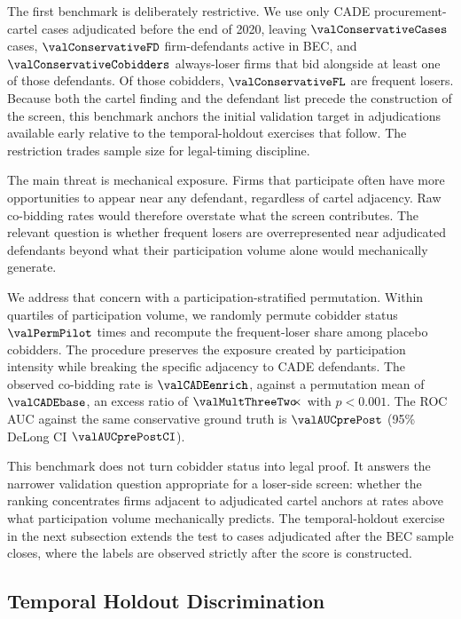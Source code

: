 The first benchmark is deliberately restrictive. We use only
CADE procurement-cartel cases adjudicated before the end of
2020, leaving $\valConservativeCases$ cases,
$\valConservativeFD$ firm-defendants active in BEC, and
$\valConservativeCobidders$ always-loser firms that bid
alongside at least one of those defendants. Of those cobidders,
$\valConservativeFL$ are frequent losers. Because both the
cartel finding and the defendant list precede the construction
of the screen, this benchmark anchors the initial validation
target in adjudications available early relative to the
temporal-holdout exercises that follow. The restriction trades
sample size for legal-timing discipline.

The main threat is mechanical exposure. Firms that participate
often have more opportunities to appear near any defendant,
regardless of cartel adjacency. Raw co-bidding rates would
therefore overstate what the screen contributes. The relevant
question is whether frequent losers are overrepresented near
adjudicated defendants beyond what their participation volume
alone would mechanically generate.

We address that concern with a participation-stratified
permutation. Within quartiles of participation volume, we
randomly permute cobidder status $\valPermPilot$ times and
recompute the frequent-loser share among placebo cobidders. The
procedure preserves the exposure created by participation
intensity while breaking the specific adjacency to CADE
defendants. The observed co-bidding rate is $\valCADEenrich$,
against a permutation mean of $\valCADEbase$, an excess ratio of
$\valMultThreeTwo\!\!\times$ with $p<0.001$. The ROC AUC against
the same conservative ground truth is $\valAUCprePost$ (95\%
DeLong CI $\valAUCprePostCI$).

This benchmark does not turn cobidder status into legal proof.
It answers the narrower validation question appropriate for a
loser-side screen: whether the ranking concentrates firms
adjacent to adjudicated cartel anchors at rates above what
participation volume mechanically predicts. The temporal-holdout
exercise in the next subsection extends the test to cases
adjudicated after the BEC sample closes, where the labels are
observed strictly after the score is constructed.

\subsection{Temporal Holdout Discrimination}
\label{sec:validation_temporal}

